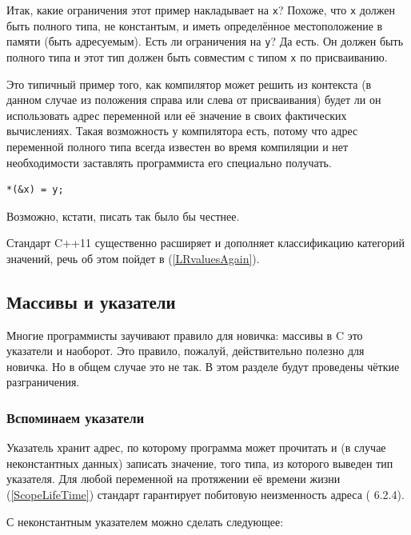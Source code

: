 \documentclass[a4paper,12pt,oneside]{article}
\begin{document}
Итак, какие ограничения этот пример накладывает на \lstinline!x!? Похоже, что \lstinline!x! должен быть полного типа, не константым, и иметь определённое местоположение в памяти (быть адресуемым). Есть ли ограничения на \lstinline!y!? Да есть. Он должен быть полного типа и этот тип должен быть совместим с типом \lstinline!x! по присваиванию.  

Это типичный пример того, как компилятор может решить из контекста (в данном случае из положения справа или слева от присваивания) будет ли он использовать адрес переменной или её значение в своих фактических вычислениях. Такая возможность у компилятора есть, потому что адрес переменной полного типа всегда известен во время компиляции и нет необходимости заставлять программиста его специально получать.

\begin{lstlisting}
*(&x) = y;
\end{lstlisting}

Возможно, кстати, писать так было бы честнее.

Стандарт C++11 существенно расширяет и дополняет классификацию категорий значений, речь об этом пойдет в (\ref{LRvaluesAgain}).

\pagebreak
\subsection{Массивы и указатели}\label{ArrPointers}

Многие программисты заучивают правило для новичка: массивы в C это указатели и наоборот. Это правило, пожалуй, действительно полезно для новичка. Но в общем случае это не так. В этом разделе будут проведены чёткие разграничения. 

\subsubsection{Вспоминаем указатели}

Указатель хранит адрес, по которому программа может прочитать и (в случае неконстантных данных) записать значение, того типа, из которого выведен тип указателя. Для любой переменной на протяжении её времени жизни (\ref{ScopeLifeTime}) стандарт гарантирует побитовую неизменность адреса (\cite{stdc11} 6.2.4).

С неконстантным указателем можно сделать следующее:
\end{document}
